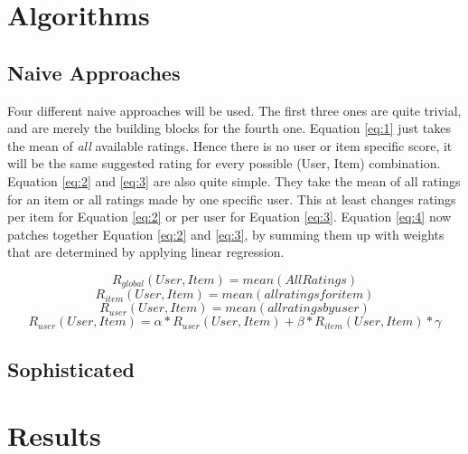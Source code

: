 \documentclass{article}[]
\begin{document}
\section{Algorithms}
\label{sec:algorithms}
\subsection{Naive Approaches}
Four different naive approaches will be used\cite{slides}. The first three ones are quite trivial, and are merely the building blocks for the fourth one.
Equation \ref{eq:1} just takes the mean of \emph{all} available ratings. Hence there is no user or item specific score, it will be the same suggested rating for every possible (User, Item) combination. Equation \ref{eq:2} and \ref{eq:3} are also quite simple. They take the mean of all ratings for an item or all ratings made by one specific user. This at least changes ratings per item for Equation \ref{eq:2} or per user for Equation \ref{eq:3}.
Equation \ref{eq:4} now patches together Equation \ref{eq:2} and \ref{eq:3}, by summing them up with weights that are determined by applying linear regression.

\begin{equation}
\label{eq:1}
R_{global}(User, Item) = mean(All Ratings)
\end{equation}
\begin{equation}
\label{eq:2}
R_{item}(User, Item) = mean(all ratings for item)
\end{equation}
\begin{equation}
\label{eq:3}
R_{user}(User, Item) = mean(all ratings by user)
\end{equation}
\begin{equation}
\label{eq:4}
R_{user}(User, Item) = \alpha * R_{user}(User, Item) + \beta * R_{item}(User, Item) * \gamma
\end{equation}

\subsection{Sophisticated}

\section{Results}
\label{sec:result}


 

	
	
\end{document}
